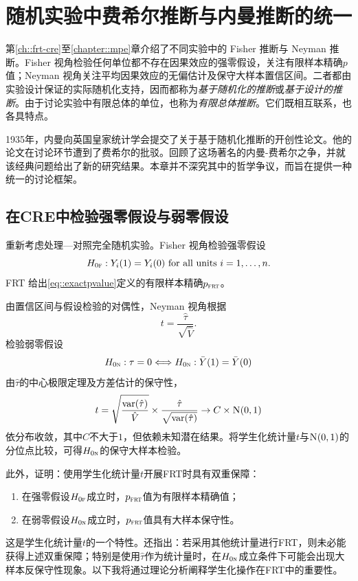 \chapter{随机实验中费希尔推断与内曼推断的统一}\label{chapter::unification-fisher-neyman}


第\ref{ch::frt-cre}至\ref{chapter::mpe}章介绍了不同实验中的 Fisher 推断与 Neyman 推断。Fisher 视角检验任何单位都不存在因果效应的强零假设，关注有限样本精确$p$值；Neyman 视角关注平均因果效应的无偏估计及保守大样本置信区间。二者都由实验设计保证的实际随机化支持，因而都称为{\it 基于随机化的推断}或{\it 基于设计的推断}。由于讨论实验中有限总体的单位，也称为{\it 有限总体推断}。它们既相互联系，也各具特点。 

1935年，内曼向英国皇家统计学会提交了关于基于随机化推断的开创性论文。他的论文\citep{neyman1935statistical}在讨论环节遭到了费希尔的批驳。\cite{sabbaghi2014comments}回顾了这场著名的内曼-费希尔之争，并就该经典问题给出了新的研究结果。本章并不深究其中的哲学争议，而旨在提供一种统一的讨论框架。 



\section{在CRE中检验强零假设与弱零假设} 
 \label{sec::strong-weak-cre-frt}
 
 
重新考虑处理—对照完全随机实验。Fisher 视角检验强零假设
$$
H_{0\textsc{f}}: Y_i(1) = Y_i(0) \text{ for all units } i=1,\ldots, n.
$$
FRT 给出\eqref{eq::exactpvalue}定义的有限样本精确$p_{\textsc{frt}}$。 
 
 
由置信区间与假设检验的对偶性，Neyman 视角根据
$$
t= 
\frac{\hat{\tau} }{  \sqrt{  \hat{V}    } }  .
$$
检验弱零假设
$$
H_{0\textsc{n}} : \tau = 0  \Longleftrightarrow H_{0\textsc{n}}: \bar{Y}(1) = \bar{Y}(0)
$$
由$\hat\tau$的中心极限定理及方差估计的保守性，
$$
t  =   \sqrt{  \frac{ \var(\hat{\tau}) }{ \hat{V} } } \times  \frac{\hat{\tau} }{  \sqrt{  \var(\hat{\tau})   } }    \rightarrow  C \times   \N01 
$$
依分布收敛，其中$C$不大于$1$，但依赖未知潜在结果。将学生化统计量$t$与$\N01$的分位点比较，可得$H_{0\textsc{n}}$的保守大样本检验。 

此外，\citet{ding2017randomization}证明：使用学生化统计量$t$开展FRT时具有双重保障：
\begin{enumerate}
\item 
 在强零假设$H_{0\textsc{f}}$成立时，$p_{\textsc{frt}}$值为有限样本精确值；
\item
 在弱零假设$H_{0\textsc{n}}$成立时，$p_{\textsc{frt}}$值具有大样本保守性。
\end{enumerate}
这是学生化统计量$t$的一个特性。\citet{ding2017randomization}还指出：若采用其他统计量进行FRT，则未必能获得上述双重保障；特别是使用$\hat{\tau}$作为统计量时，在$H_{0\textsc{n}}$成立条件下可能会出现大样本反保守性现象。以下我将通过理论分析阐释学生化操作在FRT中的重要性。


